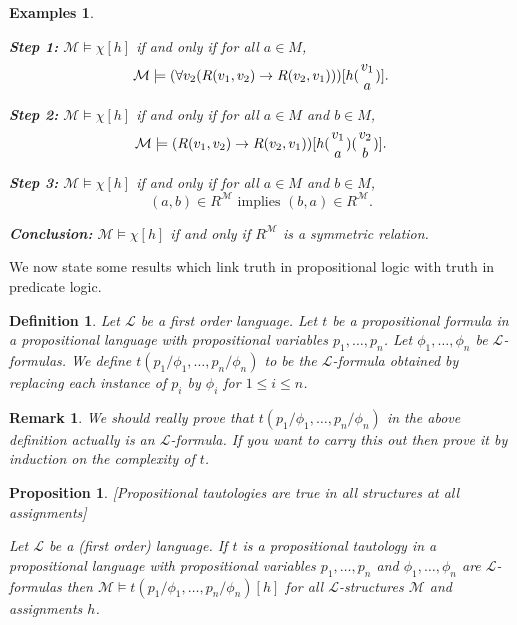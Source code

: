 \documentclass[11pt]{article}
\newtheorem{remark}[theorem]{Remark}
\newtheorem{proposition}[theorem]{Proposition}
\newtheorem{examples}[theorem]{Examples}
\newtheorem{definition}[theorem]{Definition}
\newcommand{\mcal}[1]{\mathcal{#1}}
\begin{document}
\begin{examples}
\begin{enumerate}[(i)]
\medskip

\noindent
\textbf{Step 1:} $\mcal{M}\models \chi[h]$ if and only if for all $a\in M$,
\[\mcal{M}\models (\forall v_2 (R(v_1,v_2)\rightarrow R(v_2,v_1)))[h({v_1\atop a})].\]

\medskip
\noindent
\textbf{Step 2:} $\mcal{M}\models \chi[h]$ if and only if for all $a\in M$ and $b\in M$,
\[\mcal{M}\models (R(v_1,v_2)\rightarrow R(v_2,v_1))[h({v_1\atop a})({v_2 \atop b})].\]

\medskip
\noindent
\textbf{Step 3:} $\mcal{M}\models \chi[h]$ if and only if for all $a\in M$ and $b\in M$,
\[(a,b)\in R^{\mcal{M}} \text{ implies } (b,a)\in R^{\mcal{M}}.\]

\medskip
\noindent
\textbf{Conclusion:} $\mcal{M}\models \chi[h]$ if and only if $R^{\mcal{M}}$ is a symmetric relation.
\end{enumerate}
\end{examples}



We now state some results which link truth in propositional logic with truth in predicate logic.

\begin{definition}
Let $\mcal{L}$ be a first order language. Let $t$ be a propositional formula in a propositional language with propositional variables $p_1,\ldots,p_n$. Let $\phi_1,\ldots,\phi_n$ be $\mcal{L}$-formulas. We define $t(p_1/\phi_1,\ldots,p_n/\phi_n)$ to be the $\mcal{L}$-formula obtained by replacing each instance of $p_i$ by $\phi_i$ for $1\leq i\leq n$.
\end{definition}

\begin{remark}
We should really prove that $t(p_1/\phi_1,\ldots,p_n/\phi_n)$ in the above definition actually is an $\mcal{L}$-formula. If you want to carry this out then prove it by induction on the complexity of $t$.
\end{remark}


\begin{proposition}\label{proptautaretrue}[Propositional tautologies are true in all structures at all assignments]
\

\noindent
Let $\mcal{L}$ be a (first order) language. If $t$ is a propositional tautology in a propositional language with propositional variables $p_1,\ldots,p_n$ and $\phi_1,\ldots,\phi_n$ are $\mcal{L}$-formulas then $\mcal{M}\models t(p_1/\phi_1,\ldots,p_n/\phi_n)[h]$ for all $\mcal{L}$-structures $\mcal{M}$ and assignments $h$.
\end{proposition}
\end{document}
